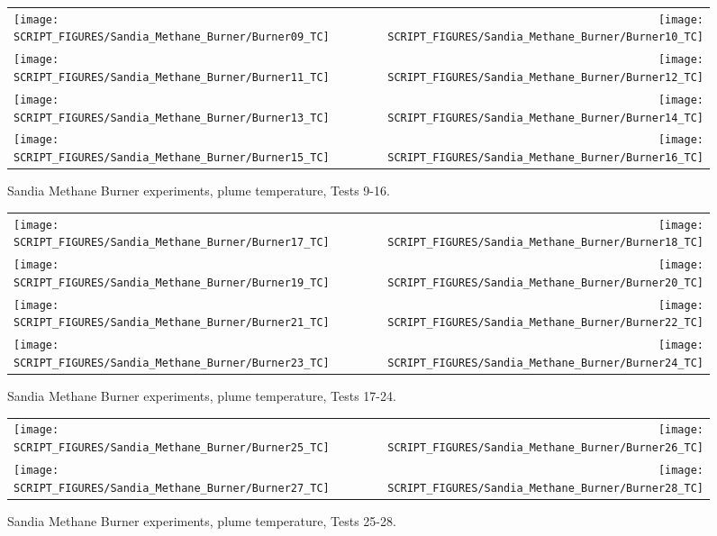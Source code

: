 \begin{figure}[p]
\begin{tabular*}{\textwidth}{l@{\extracolsep{\fill}}r}
\texttt{[image: SCRIPT\_FIGURES/Sandia\_Methane\_Burner/Burner09\_TC]} &
\texttt{[image: SCRIPT\_FIGURES/Sandia\_Methane\_Burner/Burner10\_TC]} \\
\texttt{[image: SCRIPT\_FIGURES/Sandia\_Methane\_Burner/Burner11\_TC]} &
\texttt{[image: SCRIPT\_FIGURES/Sandia\_Methane\_Burner/Burner12\_TC]} \\
\texttt{[image: SCRIPT\_FIGURES/Sandia\_Methane\_Burner/Burner13\_TC]} &
\texttt{[image: SCRIPT\_FIGURES/Sandia\_Methane\_Burner/Burner14\_TC]} \\
\texttt{[image: SCRIPT\_FIGURES/Sandia\_Methane\_Burner/Burner15\_TC]} &
\texttt{[image: SCRIPT\_FIGURES/Sandia\_Methane\_Burner/Burner16\_TC]}
\end{tabular*}
\caption[Sandia Methane Burner, plume temperature, Tests 9-16]{Sandia Methane Burner experiments, plume temperature, Tests 9-16.}
\label{Sandia_Methane_Burner_TC_2}
\end{figure}

\begin{figure}[p]
\begin{tabular*}{\textwidth}{l@{\extracolsep{\fill}}r}
\texttt{[image: SCRIPT\_FIGURES/Sandia\_Methane\_Burner/Burner17\_TC]} &
\texttt{[image: SCRIPT\_FIGURES/Sandia\_Methane\_Burner/Burner18\_TC]} \\
\texttt{[image: SCRIPT\_FIGURES/Sandia\_Methane\_Burner/Burner19\_TC]} &
\texttt{[image: SCRIPT\_FIGURES/Sandia\_Methane\_Burner/Burner20\_TC]} \\
\texttt{[image: SCRIPT\_FIGURES/Sandia\_Methane\_Burner/Burner21\_TC]} &
\texttt{[image: SCRIPT\_FIGURES/Sandia\_Methane\_Burner/Burner22\_TC]} \\
\texttt{[image: SCRIPT\_FIGURES/Sandia\_Methane\_Burner/Burner23\_TC]} &
\texttt{[image: SCRIPT\_FIGURES/Sandia\_Methane\_Burner/Burner24\_TC]}
\end{tabular*}
\caption[Sandia Methane Burner, plume temperature, Tests 17-24]{Sandia Methane Burner experiments, plume temperature, Tests 17-24.}
\label{Sandia_Methane_Burner_TC_3}
\end{figure}

\begin{figure}[p]
\begin{tabular*}{\textwidth}{l@{\extracolsep{\fill}}r}
\texttt{[image: SCRIPT\_FIGURES/Sandia\_Methane\_Burner/Burner25\_TC]} &
\texttt{[image: SCRIPT\_FIGURES/Sandia\_Methane\_Burner/Burner26\_TC]} \\
\texttt{[image: SCRIPT\_FIGURES/Sandia\_Methane\_Burner/Burner27\_TC]} &
\texttt{[image: SCRIPT\_FIGURES/Sandia\_Methane\_Burner/Burner28\_TC]}
\end{tabular*}
\caption[Sandia Methane Burner, plume temperature, Tests 25-28]{Sandia Methane Burner experiments, plume temperature, Tests 25-28.}
\label{Sandia_Methane_Burner_TC_4}
\end{figure}


